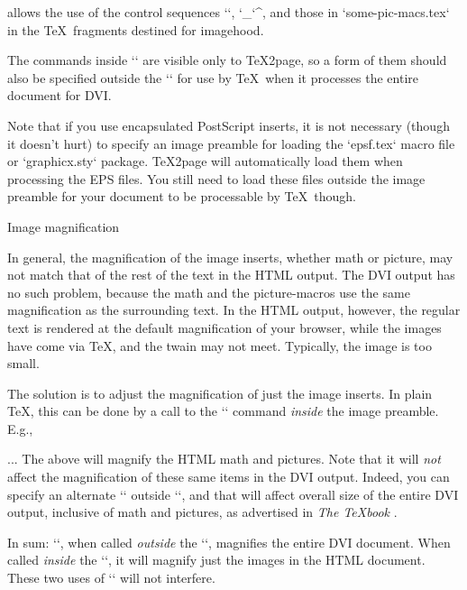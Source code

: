 \begintt
\ifx\shipout\UnDeFiNeD %
  \imgpreamble
    
    \let\gO\Omega
    \def\I#1#2{\int_{#1}^#2}
  \endimgpreamble
\fi
\endtt
%
allows the use of the control sequences `\gO`,
`\I`, and those in `some-pic-macs.tex` in the
\TeX\ fragments destined for imagehood.

The commands inside `\imgpreamble` are visible only
to \TeX2page, so a form of them should also be
specified outside the `\imgpreamble` for use by \TeX\
when it processes the entire document for DVI.

Note that if you use encapsulated PostScript inserts,
it is not necessary (though it doesn’t hurt) to
specify an image preamble for loading the `epsf.tex`
macro file or `graphicx.sty` package.  \TeX2page will
automatically load them when processing the EPS files.
You still need to load these files outside the image
preamble for your document to be processable by \TeX\
though.

\beginsection Image magnification

%
In general, the magnification of the image
inserts, whether math or picture, may not match that
of the rest of the text in the HTML output.  The DVI
output has no such problem, because the math and
the picture-macros use the same magnification as the
surrounding text.  In the HTML output, however, the
regular text is rendered at the default magnification
of your browser, while the images have come via \TeX,
and the twain may not meet.  Typically, the image is
too small.

The solution is to adjust the magnification of  just
the image inserts.  In plain \TeX, this can be
done by a call to the `\magnification` command {\em
inside} the image preamble.  E.g.,

\begintt
\ifx\shipout\UnDeFiNeD
  \imgpreamble
    \magnification{}
    ...
  \endimgpreamble
\fi
\endtt
%
The above will magnify the HTML math and pictures.
Note that it will {\em not} affect the magnification
of these same items in the DVI output.  Indeed,
you can specify an alternate `\magnification`
outside `\imgpreamble`, and that will affect
overall size of the entire DVI output, inclusive of
math and pictures, as advertised in {\em The \TeX book}
\cite{texbook}.

In sum: `\magnification`, when called {\em
outside} the `\imgpreamble`, magnifies the
entire DVI document.  When called {\em inside}
the `\imgpreamble`, it will magnify  just the
images in the HTML document.  These two uses
of `\magnification` will not interfere.

